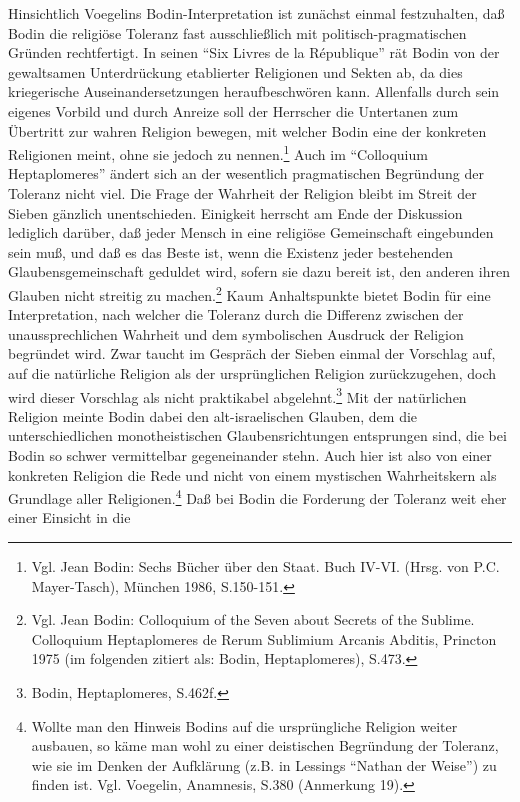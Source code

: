 Hinsichtlich Voegelins Bodin-Interpretation ist zunächst einmal festzuhalten,
daß Bodin die religiöse Toleranz fast ausschließlich mit
politisch-pragmatischen Gründen rechtfertigt.  In seinen "`Six Livres de la
République"' rät Bodin von der gewaltsamen Unterdrückung etablierter
Religionen und Sekten ab, da dies kriegerische Auseinandersetzungen
heraufbeschwören kann. Allenfalls durch sein eigenes Vorbild und durch Anreize
soll der Herrscher die Untertanen zum Übertritt zur wahren Religion bewegen,
mit welcher Bodin eine der konkreten Religionen meint, ohne sie jedoch zu
nennen.\footnote{Vgl. Jean Bodin: Sechs Bücher über den Staat. Buch IV-VI.
  (Hrsg. von P.C. Mayer-Tasch), München 1986, S.150-151.} Auch im "`Colloquium
Heptaplomeres"' ändert sich an der wesentlich pragmatischen Begründung der
Toleranz nicht viel. Die Frage der Wahrheit der Religion bleibt im Streit der
Sieben gänzlich unentschieden.  Einigkeit herrscht am Ende der Diskussion
lediglich darüber, daß jeder Mensch in eine religiöse Gemeinschaft eingebunden
sein muß, und daß es das Beste ist, wenn die Existenz jeder bestehenden
Glaubensgemeinschaft geduldet wird, sofern sie dazu bereit ist, den anderen
ihren Glauben nicht streitig zu machen.\footnote{Vgl. Jean Bodin: Colloquium
  of the Seven about Secrets of the Sublime.  Colloquium Heptaplomeres de
  Rerum Sublimium Arcanis Abditis, Princton 1975 (im folgenden zitiert als:
  Bodin, Heptaplomeres), S.473.} Kaum Anhaltspunkte bietet Bodin für
eine Interpretation, nach welcher die Toleranz durch die Differenz zwischen
der unaussprechlichen Wahrheit und dem symbolischen Ausdruck der Religion
begründet wird. Zwar taucht im Gespräch der Sieben einmal der Vorschlag auf,
auf die natürliche Religion als der ursprünglichen Religion zurückzugehen,
doch wird dieser Vorschlag als nicht praktikabel abgelehnt.\footnote{Bodin,
  Heptaplomeres, S.462f.} Mit der natürlichen Religion meinte Bodin dabei den
alt-israelischen Glauben, dem die unterschiedlichen monotheistischen
Glaubensrichtungen entsprungen sind, die bei Bodin so schwer vermittelbar
gegeneinander stehn. Auch hier ist also von einer konkreten Religion die Rede
und nicht von einem mystischen Wahrheitskern als Grundlage aller
Religionen.\footnote{Wollte man den Hinweis Bodins auf die ursprüngliche
  Religion weiter ausbauen, so käme man wohl zu einer deistischen Begründung
  der Toleranz, wie sie im Denken der Aufklärung (z.B.  in Lessings "`Nathan
  der Weise"') zu finden ist. Vgl. Voegelin, Anamnesis, S.380 (Anmerkung 19).}
Daß bei Bodin die Forderung der Toleranz weit eher einer Einsicht in die
